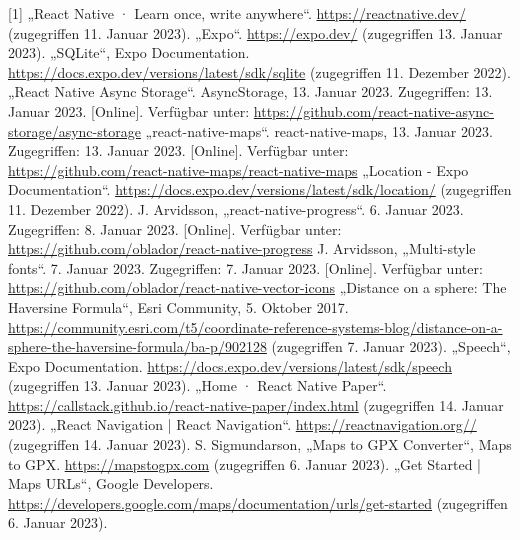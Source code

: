 \documentclass[12pt,oneside]{report}
\begin{document}
  \begin{thebibliography}{10}
     [1] „React Native · Learn once, write anywhere“. \url{https://reactnative.dev/} (zugegriffen 11. Januar 2023).
     „Expo“. \url{https://expo.dev/} (zugegriffen 13. Januar 2023).
     „SQLite“, Expo Documentation. \url{https://docs.expo.dev/versions/latest/sdk/sqlite} (zugegriffen 11. Dezember 2022).
     „React Native Async Storage“. AsyncStorage, 13. Januar 2023. Zugegriffen: 13. Januar 2023. [Online]. Verfügbar unter: \url{https://github.com/react-native-async-storage/async-storage}
     „react-native-maps“. react-native-maps, 13. Januar 2023. Zugegriffen: 13. Januar 2023. [Online]. Verfügbar unter: \url{https://github.com/react-native-maps/react-native-maps}
     „Location - Expo Documentation“. \url{https://docs.expo.dev/versions/latest/sdk/location/} (zugegriffen 11. Dezember 2022).
     J. Arvidsson, „react-native-progress“. 6. Januar 2023. Zugegriffen: 8. Januar 2023. [Online]. Verfügbar unter: \url{https://github.com/oblador/react-native-progress}
     J. Arvidsson, „Multi-style fonts“. 7. Januar 2023. Zugegriffen: 7. Januar 2023. [Online]. Verfügbar unter: \url{https://github.com/oblador/react-native-vector-icons}
     „Distance on a sphere: The Haversine Formula“, Esri Community, 5. Oktober 2017. \url{https://community.esri.com/t5/coordinate-reference-systems-blog/distance-on-a-sphere-the-haversine-formula/ba-p/902128} (zugegriffen 7. Januar 2023).
     „Speech“, Expo Documentation. \url{https://docs.expo.dev/versions/latest/sdk/speech} (zugegriffen 13. Januar 2023).
     „Home · React Native Paper“. \url{https://callstack.github.io/react-native-paper/index.html} (zugegriffen 14. Januar 2023).
     „React Navigation | React Navigation“. \url{https://reactnavigation.org//} (zugegriffen 14. Januar 2023).
     S. Sigmundarson, „Maps to GPX Converter“, Maps to GPX. \url{https://mapstogpx.com} (zugegriffen 6. Januar 2023).
     „Get Started | Maps URLs“, Google Developers. \url{https://developers.google.com/maps/documentation/urls/get-started} (zugegriffen 6. Januar 2023).
    
    
    
    
    
    
    
    
    
    
    
    
    
  \end{thebibliography}
  \newpage
  
  \listoffigures
  \newpage
  
  \lstlistoflistings
  \newpage

  
\end{document}
